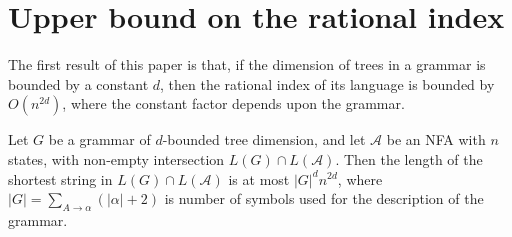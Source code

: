 \documentclass[runningheads]{llncs}
\begin{document}

\section{Upper bound on the rational index}\label{section_upper_bound} %

The first result of this paper
is that, if the dimension of trees in a grammar is bounded by a constant $d$,
then the rational index of its language is bounded by $O(n^{2d})$,
where the constant factor depends upon the grammar.

\begin{theorem}\label{oscbnddim}
Let $G$ be a grammar of $d$-bounded tree dimension,
and let $\mathcal{A}$ be an NFA with $n$ states,
with non-empty intersection $L(G) \cap L(\mathcal{A})$.
Then the length of the shortest string in $L(G) \cap L(\mathcal{A})$ is at most $|G|^d n^{2d}$,
where $|G|=\sum_{A \to \alpha} (|\alpha|+2)$ is number of symbols
used for the description of the grammar.
\end{theorem}
\end{document}

